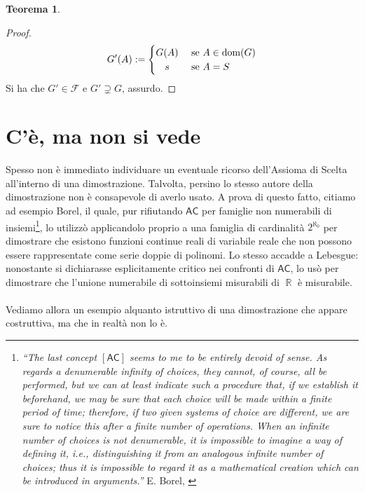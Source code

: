 \documentclass[12pt,a4paper]{report}
\theoremstyle{definition}
\newtheorem{teo}{Teorema}[section]  %
\theoremstyle{num.custom-title}
\DeclareMathOperator{\dom}{dom}
\DeclareMathOperator{\R}{\mathbb{R}}
\newcommand{\AC}{\ensuremath{\mathsf{AC}}\xspace}
\begin{document}
\begin{teo}
\begin{proof}
\[
G'(A):= 
  \begin{cases} 
      \hfill G(A)	\hfill & \text{ se $A \in \dom(G)$} \\
      \hfill  s		\hfill & \text{ se $A=S$} \\
  \end{cases}
\]
Si ha che $G' \in \mathcal{F}$ e $G' \supsetneq G$, assurdo.
\end{proof}
\end{teo}


\section{C'è, ma non si vede}

Spesso non è immediato individuare un eventuale ricorso dell'Assioma di Scelta all'interno di una dimostrazione. Talvolta, persino lo stesso autore della dimostrazione non è consapevole di averlo usato. A prova di questo fatto, citiamo ad esempio Borel, il quale, pur rifiutando \AC per famiglie non numerabili di insiemi\footnote{\label{cit_borel}\emph{``The last concept $[\AC]$ seems to me to be entirely devoid of sense. As regards a denumerable infinity of choices, they cannot, of course, all be performed, but we can at least indicate such a procedure that, if we establish it beforehand, we may be sure that each choice will be made within a finite period of time; therefore, if two given systems of choice are different, we are sure to notice this after a finite number of operations. When an infinite number of choices is not denumerable, it is impossible to imagine a way of defining it, i.e., distinguishing it from an analogous infinite number of choices; thus it is impossible to regard it as a mathematical creation which can be introduced in arguments.''} E. Borel, \cite{Bor14:Herrlich}}, lo utilizzò applicandolo proprio a una famiglia di cardinalità $2^{\aleph_0}$ per dimostrare che esistono funzioni continue reali di variabile reale che non possono essere rappresentate come serie doppie di polinomi. Lo stesso accadde a Lebesgue: nonostante si dichiarasse esplicitamente critico nei confronti di \AC, lo usò per dimostrare che l'unione numerabile di sottoinsiemi misurabili di $\R$ è misurabile.\\
\\
Vediamo allora un esempio alquanto istruttivo di una dimostrazione che appare costruttiva, ma che in realtà non lo è.
\end{document}
